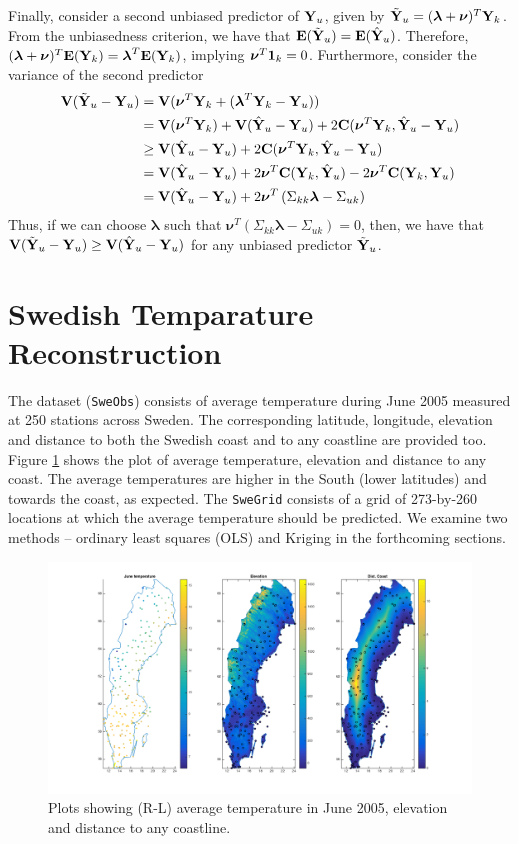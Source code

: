 \documentclass[a4paper,10pt]{article}
\def\bY{{\bf Y}}
\def\bE{{\bf E}}
\def\bV{{\bf V}}
\def\bC{{\bf C}}
\def\b1{{\bf 1}}
\def\blambda{{\boldsymbol \lambda}}
\def\bnu{{\boldsymbol \nu}}
\begin{document}
Finally, consider a second unbiased predictor of $\bY_u$, given by $\tilde \bY_u = (\blambda + \bnu)^T \bY_k$. From the unbiasedness criterion, we have that $\bE(\tilde \bY_u) = \bE(\hat \bY_u)$. Therefore, $(\blambda + \bnu)^T \bE(\bY_k) = \blambda^T \bE(\bY_k)$, implying $\bnu^T \b1_k = 0$. Furthermore, consider the variance of the second predictor
\begin{align*}
 \bV(\tilde \bY_u - \bY_u) &= \bV(\bnu^T \bY_k + (\blambda^T \bY_k - \bY_u))\\
 &= \bV(\bnu^T \bY_k) + \bV(\hat \bY_u - \bY_u) + 2\bC(\bnu^T \bY_k, \hat \bY_u - \bY_u) \\
 &\ge \bV(\hat \bY_u - \bY_u) + 2\bC(\bnu^T \bY_k, \hat \bY_u - \bY_u)\\
 &= \bV(\hat \bY_u - \bY_u) + 2\bnu^T \bC(\bY_k, \hat \bY_u) - 2 \bnu^T \bC(\bY_k, \bY_u) \\
 &= \bV(\hat \bY_u - \bY_u) + 2\bnu^T \left(  \Sigma_{kk} \blambda - \Sigma_{uk}\right)
\end{align*}
Thus, if we can choose $\blambda$ such that $\bnu^T \left(  \Sigma_{kk} \blambda - \Sigma_{uk}\right) = 0$, then, we have that $\bV(\tilde \bY_u - \bY_u) \ge \bV(\hat \bY_u - \bY_u)$ for any unbiased predictor $\tilde \bY_u$.

\section{Swedish Temparature Reconstruction}
The dataset ({\texttt{SweObs}}) consists of average temperature during June 2005 measured at 250 stations across Sweden. The corresponding latitude, longitude, elevation and distance to both the Swedish coast and to any coastline are provided too. Figure \ref{fig:rawdataplot} shows the plot of average temperature, elevation and distance to any coast. The average temperatures are higher in the South (lower latitudes) and towards the coast, as expected. The \texttt{SweGrid} consists of a grid of 273-by-260 locations at which the average temperature should be predicted. We examine two methods -- ordinary least squares (OLS) and Kriging in the forthcoming sections.
\begin{figure}[ht]
	\centering
	\includegraphics[width=0.8\linewidth]{raw_data_plot.png}
	\caption{Plots showing (R-L) average temperature in June 2005, elevation and distance to any coastline.}
	\label{fig:rawdataplot}
\end{figure}
\end{document}
